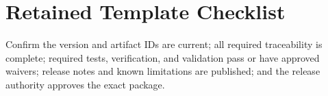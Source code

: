 

\section{Retained Template Checklist}
Confirm the version and artifact IDs are current; all required traceability is complete; required tests, verification, and validation pass or have approved waivers; release notes and known limitations are published; and the release authority approves the exact package.
